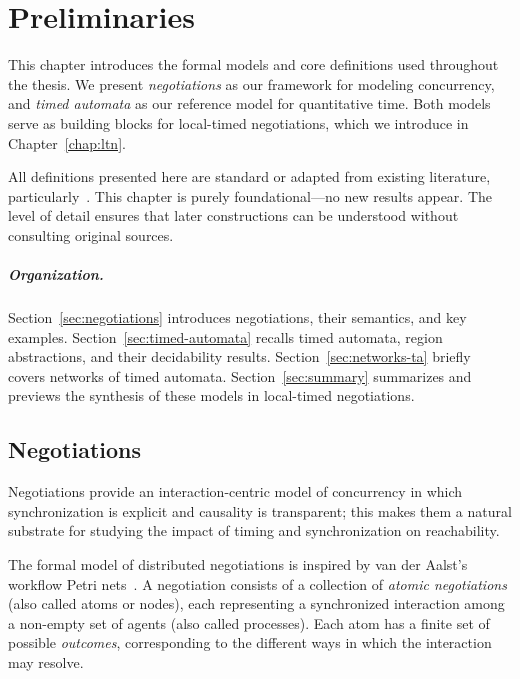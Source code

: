
\chapter{Preliminaries}
\label{chap:preliminaries}

This chapter introduces the formal models and core definitions used throughout the thesis. We present \emph{negotiations} as our framework for modeling concurrency, and \emph{timed automata} as our reference model for quantitative time. Both models serve as building blocks for local-timed negotiations, which we introduce in Chapter~\ref{chap:ltn}.

All definitions presented here are standard or adapted from existing literature, particularly~\cite{EsparzaDeselNegotiations,AlurDillTA}. This chapter is purely foundational—no new results appear. The level of detail ensures that later constructions can be understood without consulting original sources.

\paragraph{Organization.} Section~\ref{sec:negotiations} introduces negotiations, their semantics, and key examples. Section~\ref{sec:timed-automata} recalls timed automata, region abstractions, and their decidability results. Section~\ref{sec:networks-ta} briefly covers networks of timed automata. Section~\ref{sec:summary} summarizes and previews the synthesis of these models in local-timed negotiations.


\section{Negotiations}
Negotiations provide an interaction-centric model of concurrency in which synchronization is explicit and causality is transparent; this makes them a natural substrate for studying the impact of timing and synchronization on reachability.

The formal model of distributed negotiations is inspired by van der Aalst’s workflow Petri nets~\cite{}. A negotiation consists of a collection of \emph{atomic negotiations} (also called atoms or nodes), each representing a synchronized interaction among a non-empty set of agents (also called processes). Each atom has a finite set of possible \emph{outcomes}, corresponding to the different ways in which the interaction may resolve.

